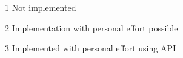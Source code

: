 \begin{table}[htp!]
\begin{threeparttable}
\begin{tabular}{llllll}
            \hline
            \end{tabular}
            \begin{tablenotes}\footnotesize 
    		    \item[1] Not implemented
        		\item[2] Implementation with personal effort possible
        		\item[3] Implemented with personal effort using API
    		\end{tablenotes}
    		\label{table: impl results}
		\end{threeparttable}
    \end{table}